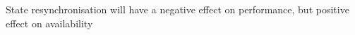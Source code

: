 

\begin{description}[style=nextline]
  \item[T1\label{t1}] State resynchronisation will have a negative effect on performance, but positive effect on availability
\end{description}
